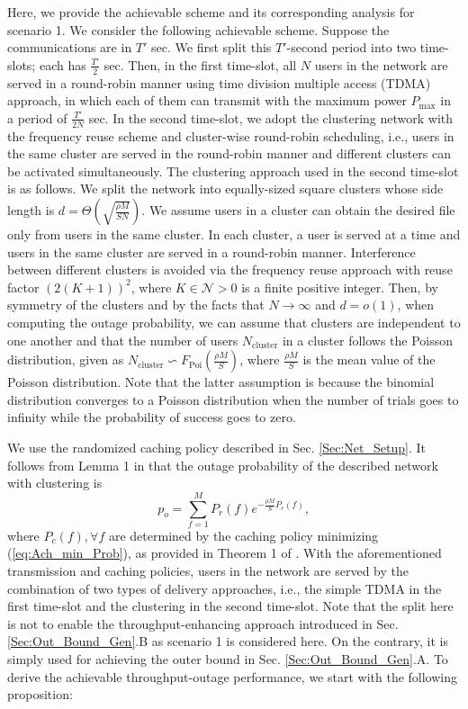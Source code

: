 \documentclass[journal,draftclsnofoot,onecolumn,12pt,twoside]{IEEEtran}
\begin{document}
Here, we provide the achievable scheme and its corresponding analysis for scenario 1. We consider the following achievable scheme. Suppose the communications are in $T'$ sec. We first split this $T'$-second period into two time-slots; each has $\frac{T'}{2}$ sec. Then, in the first time-slot, all $N$ users in the network are served in a round-robin manner using time division multiple access (TDMA) approach, in which each of them can transmit with the maximum power $P_{\text{max}}$ in a period of $\frac{T'}{2N}$ sec. In the second time-slot, we adopt the clustering network with the frequency reuse scheme and cluster-wise round-robin scheduling, i.e., users in the same cluster are served in the round-robin manner and different clusters can be activated simultaneously. The clustering approach used in the second time-slot is as follows. We split the network into equally-sized square clusters whose side length is $d=\Theta\left(\sqrt{\frac{\rho M}{SN}}\right)$. We assume users in a cluster can obtain the desired file only from users in the same cluster. In each cluster, a user is served at a time and users in the same cluster are served in a round-robin manner. Interference between different clusters is avoided via the frequency reuse approach with reuse factor $(2(K+1))^2$, where $K\in\mathcal{N}>0$ is a finite positive integer. Then, by symmetry of the clusters and by the facts that $N\to\infty$ and $d=o(1)$, when computing the outage probability, we can assume that clusters are independent to one another and that the number of users $N_{\text{cluster}}$ in a cluster follows the Poisson distribution, given as $N_{\text{cluster}}\backsim F_{\text{Poi}}\left(\frac{\rho M}{S}\right)$, where $\frac{\rho M}{S}$ is the mean value of the Poisson distribution. Note that the latter assumption is because the binomial distribution converges to a Poisson distribution when the number of trials goes to infinity while the probability of success goes to zero. 

We use the randomized caching policy described in Sec. \ref{Sec:Net_Setup}. It follows from Lemma 1 in \cite{lee2020optimal} that the outage probability of the described network with clustering is 
\begin{equation}\label{eq:Ach_min_Prob}
p_o=\sum_{f=1}^M P_r(f) e^{-\frac{\rho M}{S}P_c(f)},
\end{equation}
where $P_c(f),\forall f$ are determined by the caching policy minimizing (\ref{eq:Ach_min_Prob}), as provided in Theorem 1 of \cite{lee2020optimal}. With the aforementioned transmission and caching policies, users in the network are served by the combination of two types of delivery approaches, i.e., the simple TDMA in the first time-slot and the clustering in the second time-slot. Note that the split here is not to enable the throughput-enhancing approach introduced in Sec. \ref{Sec:Out_Bound_Gen}.B as scenario 1 is considered here. On the contrary, it is simply used for achieving the outer bound in Sec. \ref{Sec:Out_Bound_Gen}.A. To derive the achievable throughput-outage performance, we start with the following proposition:
\end{document}
